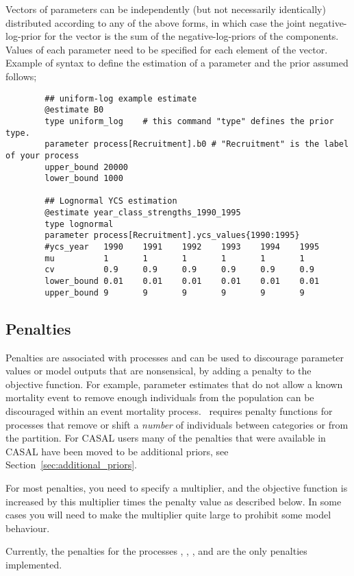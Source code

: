 Vectors of parameters can be independently (but not necessarily identically) distributed according to any of the above forms, in which case the joint negative-log-prior for the vector is the sum of the negative-log-priors of the components. Values of each parameter need to be specified for each element of the vector. Example of syntax to define the estimation of a parameter and the prior assumed follows;

{\small{\begin{verbatim}
		## uniform-log example estimate
		@estimate B0
		type uniform_log	# this command "type" defines the prior type.
		parameter process[Recruitment].b0 # "Recruitment" is the label of your process
		upper_bound 20000
		lower_bound 1000

		## Lognormal YCS estimation
		@estimate year_class_strengths_1990_1995
		type lognormal
		parameter process[Recruitment].ycs_values{1990:1995}
		#ycs_year   1990	1991	1992	1993	1994	1995
		mu   		1   	1   	1   	1   	1   	1
		cv 			0.9 	0.9 	0.9 	0.9 	0.9 	0.9
		lower_bound 0.01	0.01	0.01	0.01	0.01	0.01
		upper_bound 9		9		9		9		9		9

\end{verbatim}}}

\subsection{Penalties\label{sec:penalties}}

Penalties are associated with processes and can be used to discourage parameter values or model outputs that are nonsensical, by adding a penalty to the objective function. For example, parameter estimates that do not allow a known mortality event to remove enough individuals from the population can be discouraged within an event mortality process. \CNAME\ requires penalty functions for processes that remove or shift a \emph{number} of individuals between categories or from the partition. For CASAL users many of the penalties that were available in CASAL have been moved to be additional priors, see Section~\ref{sec:additional_priors}.

For most penalties, you need to specify a multiplier, and the objective function is increased by this multiplier times the penalty value as described below. In some cases you will need to make the multiplier quite large to prohibit some model behaviour.

Currently, the penalties for the processes ,
,
,  and  are the only penalties implemented.

